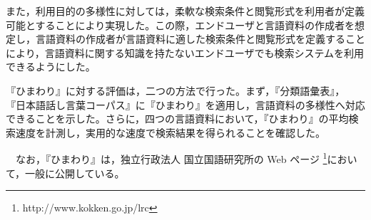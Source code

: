 また，利用目的の多様性に対しては，柔軟な検索条件と閲覧形式を利用者が定義
可能とすることにより実現した。この際，エンドユーザと言語資料の作成者を想
定し，言語資料の作成者が言語資料に適した検索条件と閲覧形式を定義すること
により，言語資料に関する知識を持たないエンドユーザでも検索システムを利用
できるようにした。

『ひまわり』に対する評価は，二つの方法で行った。まず，『分類語彙表』，
『日本語話し言葉コーパス』に『ひまわり』を適用し，言語資料の多様性へ対応
できることを示した。さらに，四つの言語資料において，『ひまわり』の平均検
索速度を計測し，実用的な速度で検索結果を得られることを確認した。

　なお，『ひまわり』は，独立行政法人 国立国語研究所の Web ページ
\footnote{http://www.kokken.go.jp/lrc}において，一般に公開している。



